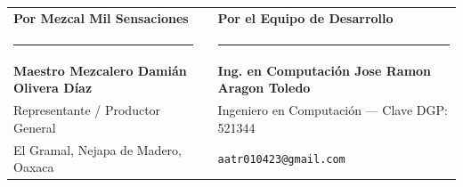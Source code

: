 \documentclass[11pt,letterpaper]{article}
\begin{document}
\vspace{0.5cm}

\noindent
\begin{tabularx}{\textwidth}{>{\centering\arraybackslash}X p{1cm} >{\centering\arraybackslash}X}
    \textbf{Por Mezcal Mil Sensaciones} & & \textbf{Por el Equipo de Desarrollo} \\[1.2cm]
    \rule{6.2cm}{0.8pt} & & \rule{6.2cm}{0.8pt} \\
    \textbf{Maestro Mezcalero Damián Olivera Díaz} & & \textbf{Ing. en Computación Jose Ramon Aragon Toledo} \\
    Representante / Productor General & & Ingeniero en Computación — Clave DGP: 521344 \\
    El Gramal, Nejapa de Madero, Oaxaca & & \texttt{aatr010423@gmail.com}
\end{tabularx}
\end{document}
